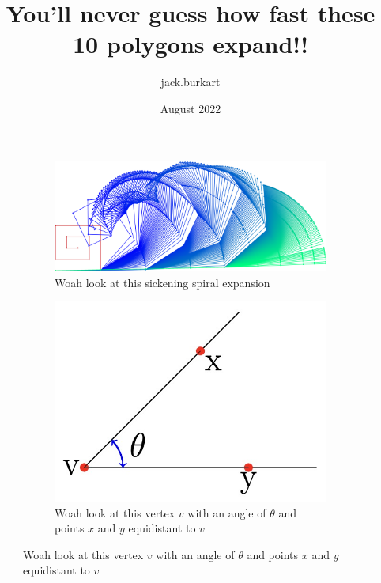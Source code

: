 \documentclass{article}
\title{You'll never guess how fast these 10 polygons expand!!}
\author{jack.burkart }
\date{August 2022}
\begin{document}
\maketitle



      
 \begin{figure}[ht!]
    \centering
    \begin{subfigure}{\textwidth}
        \centering
        \includegraphics[width=\textwidth]{figures/spiral_fourth.png}
        \caption{Woah look at this sickening spiral expansion}
        \label{fig:spiral_fourth_expand}
    \end{subfigure}
    \hfill
    
    \begin{subfigure}{\textwidth}
        \centering
        \includegraphics[width=\textwidth]{figures/adj ca.jpg}
        \caption{Woah look at this vertex $v$ with an angle of $\theta$ and points $x$ and $y$ equidistant to $v$}
        \label{fig:my_label}
    \end{subfigure}

       
   
\end{figure}
\end{document}
